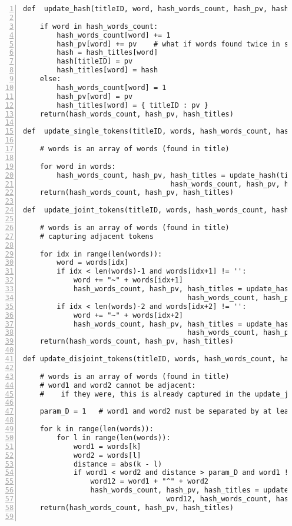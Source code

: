 \documentclass[oneside,10pt]{book}
\begin{document}
\begin{lstlisting}[numbers=left]
def  update_hash(titleID, word, hash_words_count, hash_pv, hash_titles):

    if word in hash_words_count:
        hash_words_count[word] += 1
        hash_pv[word] += pv    # what if words found twice in same title ??
        hash = hash_titles[word]
        hash[titleID] = pv
        hash_titles[word] = hash
    else:
        hash_words_count[word] = 1
        hash_pv[word] = pv
        hash_titles[word] = { titleID : pv }
    return(hash_words_count, hash_pv, hash_titles)

def  update_single_tokens(titleID, words, hash_words_count, hash_pv, hash_titles):

    # words is an array of words (found in title)

    for word in words:
        hash_words_count, hash_pv, hash_titles = update_hash(titleID, word, 
                                   hash_words_count, hash_pv, hash_titles)
    return(hash_words_count, hash_pv, hash_titles)

def  update_joint_tokens(titleID, words, hash_words_count, hash_pv, hash_titles): 

    # words is an array of words (found in title)
    # capturing adjacent tokens

    for idx in range(len(words)):
        word = words[idx]
        if idx < len(words)-1 and words[idx+1] != '':
            word += "~" + words[idx+1]
            hash_words_count, hash_pv, hash_titles = update_hash(titleID, word, 
                                       hash_words_count, hash_pv, hash_titles)
        if idx < len(words)-2 and words[idx+2] != '':
            word += "~" + words[idx+2]
            hash_words_count, hash_pv, hash_titles = update_hash(titleID, word, 
                                       hash_words_count, hash_pv, hash_titles)
    return(hash_words_count, hash_pv, hash_titles)

def update_disjoint_tokens(titleID, words, hash_words_count, hash_pv, hash_titles):
    
    # words is an array of words (found in title)
    # word1 and word2 cannot be adjacent: 
    #    if they were, this is already captured in the update_joint_tokens function

    param_D = 1   # word1 and word2 must be separated by at least param_D tokens

    for k in range(len(words)):
        for l in range(len(words)):
            word1 = words[k]
            word2 = words[l]
            distance = abs(k - l)
            if word1 < word2 and distance > param_D and word1 != '' and word2 != '':
                word12 = word1 + "^" + word2
                hash_words_count, hash_pv, hash_titles = update_hash(titleID, 
                                  word12, hash_words_count, hash_pv, hash_titles)
    return(hash_words_count, hash_pv, hash_titles)


\end{lstlisting}
\end{document}
